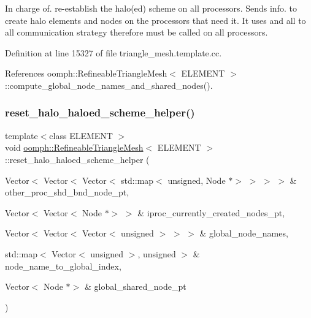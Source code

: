 In charge of. re-\/establish the halo(ed) scheme on all processors. Sends info. to create halo elements and nodes on the processors that need it. It uses and all to all communication strategy therefore must be called on all processors. 



Definition at line 15327 of file triangle\+\_\+mesh.\+template.\+cc.



References oomph\+::\+Refineable\+Triangle\+Mesh$<$ E\+L\+E\+M\+E\+N\+T $>$\+::compute\+\_\+global\+\_\+node\+\_\+names\+\_\+and\+\_\+shared\+\_\+nodes().

\mbox{\label{classoomph_1_1RefineableTriangleMesh_a604ab6d1fc1c54e1255845da75f8dc6d}} 
\subsubsection{\texorpdfstring{reset\+\_\+halo\+\_\+haloed\+\_\+scheme\+\_\+helper()}{reset\_halo\_haloed\_scheme\_helper()}}
{\footnotesize\ttfamily template$<$class E\+L\+E\+M\+E\+NT $>$ \\
void \hyperlink{classoomph_1_1RefineableTriangleMesh}{oomph\+::\+Refineable\+Triangle\+Mesh}$<$ E\+L\+E\+M\+E\+NT $>$\+::reset\+\_\+halo\+\_\+haloed\+\_\+scheme\+\_\+helper (\begin{DoxyParamCaption}\item[{Vector$<$ Vector$<$ Vector$<$ std\+::map$<$ unsigned, Node $\ast$$>$ $>$ $>$ $>$ \&}]{other\+\_\+proc\+\_\+shd\+\_\+bnd\+\_\+node\+\_\+pt,  }\item[{Vector$<$ Vector$<$ Node $\ast$$>$ $>$ \&}]{iproc\+\_\+currently\+\_\+created\+\_\+nodes\+\_\+pt,  }\item[{Vector$<$ Vector$<$ Vector$<$ unsigned $>$ $>$ $>$ \&}]{global\+\_\+node\+\_\+names,  }\item[{std\+::map$<$ Vector$<$ unsigned $>$, unsigned $>$ \&}]{node\+\_\+name\+\_\+to\+\_\+global\+\_\+index,  }\item[{Vector$<$ Node $\ast$$>$ \&}]{global\+\_\+shared\+\_\+node\+\_\+pt }\end{DoxyParamCaption})\hspace{0.3cm}{\ttfamily [protected]}}



